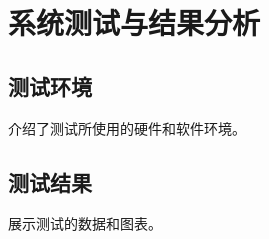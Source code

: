 \chapter{系统测试与结果分析}
\label{chap:test}

\section{测试环境}
介绍了测试所使用的硬件和软件环境。

\section{测试结果}
展示测试的数据和图表。
